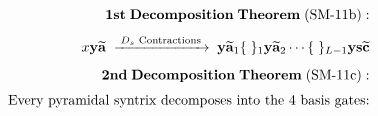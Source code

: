 \documentclass[preview]{standalone}
\begin{document}
\begin{align*}
\special{dvisvgm:raw <g id='unique000'>}\mathbf{1st\;Decomposition\;Theorem\;(\text{SM-11b}):}\\[4pt]x\mathbf{y}\widetilde{\mathbf{a}} \;\xrightarrow{\;D_s\text{ Contractions}\;}\; \mathbf{y}\widetilde{\mathbf{a}}_1\{\;\}_1\mathbf{y}\widetilde{\mathbf{a}}_2\cdots\{\;\}_{L-1}\mathbf{ys}\widetilde{\mathbf{c}}\\[5pt]\mathbf{2nd\;Decomposition\;Theorem\;(\text{SM-11c}):}\\[3pt]\text{Every pyramidal syntrix decomposes into the 4 basis gates:}\special{dvisvgm:raw </g>}
\end{align*}
\end{document}

